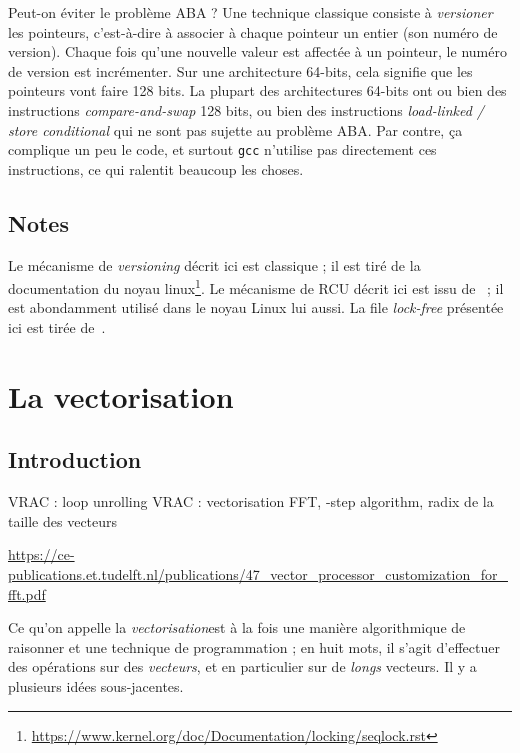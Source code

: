 Peut-on éviter le problème ABA ? Une technique classique consiste à
\emph{versioner} les pointeurs, c'est-à-dire à associer à chaque pointeur un
entier (son numéro de version). Chaque fois qu'une nouvelle valeur est affectée
à un pointeur, le numéro de version est incrémenter. Sur une architecture
64-bits, cela signifie que les pointeurs vont faire 128 bits. La plupart des
architectures 64-bits ont ou bien des instructions \emph{compare-and-swap} 128
bits, ou bien des instructions \emph{load-linked / store conditional} qui ne
sont pas sujette au problème ABA. Par contre, ça complique un peu le code, et
surtout \texttt{gcc} n'utilise pas directement ces instructions, ce qui ralentit
beaucoup les choses.



\section*{Notes}

Le mécanisme de \emph{versioning} décrit ici est classique ; il est tiré de la
documentation du noyau
linux\footnote{\url{https://www.kernel.org/doc/Documentation/locking/seqlock.rst}}. Le
mécanisme de RCU décrit ici est issu de~\cite{DesnoyersMSDW12} ; il est
abondamment utilisé dans le noyau Linux lui aussi. La file \emph{lock-free} présentée ici est
tirée de~\cite{MichaelS96}.


\chapter{La vectorisation}
\label{chap:vectorization}

\section{Introduction}

VRAC : loop unrolling
VRAC : vectorisation FFT, -step algorithm\fg, radix de la taille des vecteurs

\url{https://ce-publications.et.tudelft.nl/publications/47_vector_processor_customization_for_fft.pdf}


Ce qu'on appelle la \og \emph{vectorisation}\fg est à la fois une manière
algorithmique de raisonner et une technique de programmation ; en huit mots, il
s'agit d'effectuer des opérations sur des \emph{vecteurs}, et en particulier sur
de \emph{longs} vecteurs. Il y a plusieurs idées sous-jacentes.

